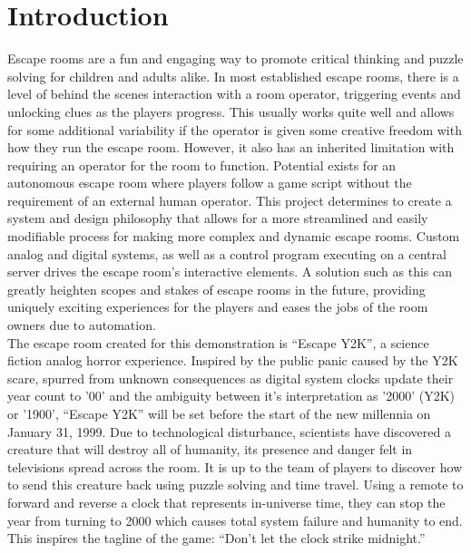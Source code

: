 \documentclass[conference]{IEEEtran}
\begin{document}
\section{Introduction}
Escape rooms are a fun and engaging way to promote critical thinking and puzzle solving for children and adults
alike. In most established escape rooms, there is a level of behind the scenes interaction with a room operator,
triggering events and unlocking clues as the players progress. This usually works quite well and allows for some
additional variability if the operator is given some creative freedom with how they run the escape room. However,
it also has an inherited limitation with requiring an operator for the room to function. Potential exists for an
autonomous escape room where players follow a game script without the requirement of an external human operator.
This project determines to create a system and design philosophy that allows for a more streamlined and easily modifiable
process for making more complex and dynamic escape rooms. Custom analog and digital systems, as well as a control program
executing on a central server drives the escape room's interactive elements. A solution such as this can greatly
heighten scopes and stakes of escape rooms in the future, providing uniquely exciting experiences for the players
and eases the jobs of the room owners due to automation.
\\
\indent The escape room created for this demonstration is ``Escape Y2K'', a science fiction analog horror experience. 
Inspired by the public panic caused by the Y2K scare, spurred from unknown consequences as digital system
clocks update their year count to '00' and the ambiguity between it's interpretation as '2000' (Y2K) or '1900',
``Escape Y2K'' will be set before the start of the new millennia on January 31, 1999. Due to technological disturbance,
scientists have discovered a creature that will destroy all of humanity, its presence and danger felt in televisions
spread across the room. It is up to the team of players to discover how to send this creature back using puzzle solving
and time travel. Using a remote to forward and reverse a clock that represents in-universe time, they can stop the year
from turning to 2000 which causes total system failure and humanity to end. This inspires the tagline of the game:
``Don't let the clock strike midnight.''
\end{document}
